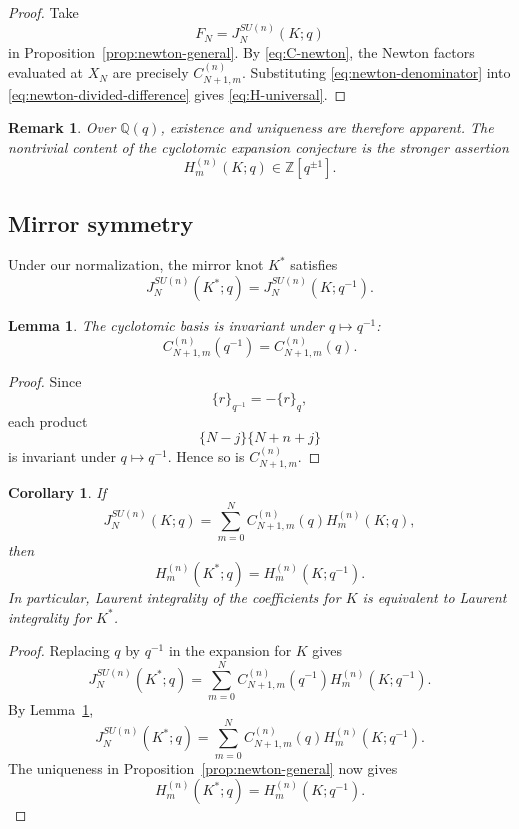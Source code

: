 \documentclass[11pt]{amsart}
\newtheorem{lemma}[theorem]{Lemma}
\newtheorem{corollary}[theorem]{Corollary}
\newtheorem{remark}[theorem]{Remark}
\newcommand{\Z}{\mathbb Z}
\newcommand{\Q}{\mathbb Q}
\begin{document}
\begin{proof}
Take
\[
F_N=J_N^{SU(n)}(K;q)
\]
in Proposition~\ref{prop:newton-general}. By \eqref{eq:C-newton}, the Newton factors evaluated at \(X_N\)
are precisely \(C_{N+1,m}^{(n)}\). 
Substituting \eqref{eq:newton-denominator} into \eqref{eq:newton-divided-difference} gives \eqref{eq:H-universal}.
\end{proof}


\begin{remark}
Over \(\Q(q)\), existence and uniqueness are therefore apparent.
The nontrivial content of the cyclotomic expansion conjecture is the
stronger assertion
\[
H_m^{(n)}(K;q)\in\Z[q^{\pm1}].
\]
\end{remark}



\subsection{Mirror symmetry}
\label{sec:mirror}

Under our normalization, the mirror knot \(K^*\) satisfies
\[
J_N^{SU(n)}(K^*;q)
=
J_N^{SU(n)}(K;q^{-1}).
\]

\begin{lemma}\label{lem:mirror-basis}
The cyclotomic basis is invariant under \(q\mapsto q^{-1}\):
\[
C_{N+1,m}^{(n)}(q^{-1})
=
C_{N+1,m}^{(n)}(q).
\]
\end{lemma}

\begin{proof}
Since
\[
\{r\}_{q^{-1}}=-\{r\}_q,
\]
each product
\[
\{N-j\}\{N+n+j\}
\]
is invariant under \(q\mapsto q^{-1}\).  Hence so is
\(C_{N+1,m}^{(n)}\).
\end{proof}

\begin{corollary}\label{cor:mirror}
If
\[
J_N^{SU(n)}(K;q)
=
\sum_{m=0}^{N}
C_{N+1,m}^{(n)}(q)
H_m^{(n)}(K;q),
\]
then
\[
H_m^{(n)}(K^*;q)
=
H_m^{(n)}(K;q^{-1}).
\]
In particular, Laurent integrality of the coefficients for \(K\)
is equivalent to Laurent integrality for \(K^*\).
\end{corollary}

\begin{proof}
Replacing \(q\) by \(q^{-1}\) in the expansion for \(K\) gives
\[
J_N^{SU(n)}(K^*;q)
=
\sum_{m=0}^{N}
C_{N+1,m}^{(n)}(q^{-1})
H_m^{(n)}(K;q^{-1}).
\]
By Lemma~\ref{lem:mirror-basis},
\[
J_N^{SU(n)}(K^*;q)
=
\sum_{m=0}^{N}
C_{N+1,m}^{(n)}(q)
H_m^{(n)}(K;q^{-1}).
\]
The uniqueness in Proposition~\ref{prop:newton-general} now gives
\[
H_m^{(n)}(K^*;q)=H_m^{(n)}(K;q^{-1}).
\]
\end{proof}
\end{document}

